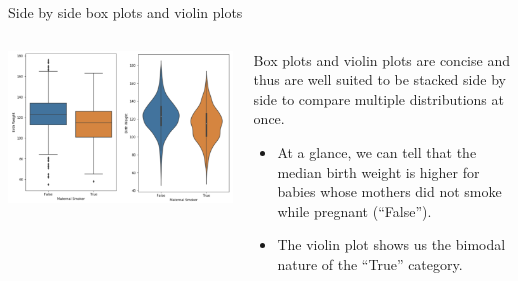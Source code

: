 \documentclass[aspectratio=169]{../latex_main/tntbeamer}  %
\begin{document}
	\begin{frame}{Side by side box plots and violin plots}
	    \begin{columns}
            \begin{column}{.5\textwidth}

                       \includegraphics[scale=.4]{Bild44}

            \end{column}
            
            \begin{column}{.5\textwidth}
               Box plots and violin plots are concise and thus are well suited to be stacked side by side to compare multiple distributions at once.
               \begin{itemize}
                   \item At a glance, we can tell that the median birth weight is higher for babies whose mothers did not smoke while pregnant (“False”).
                   \item The violin plot shows us the bimodal nature of the “True” category.
               \end{itemize}
            \end{column}
        \end{columns}
	\end{frame}
\end{document}
